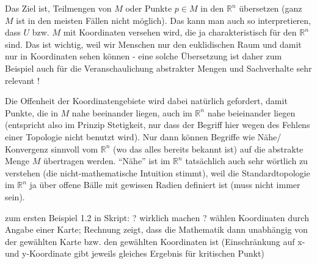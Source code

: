 \documentclass[../H_Analysis_main.tex]{subfiles}
\begin{document}
Das Ziel ist, Teilmengen von $M$ oder Punkte $p \in M$ in den $\mathbb{R}^n$ übersetzen (ganz $M$ ist in den meisten Fällen nicht möglich). Das kann man auch so interpretieren, dass $U$ bzw. $M$ mit Koordinaten versehen wird, die ja charakteristisch für den $\mathbb{R}^n$ sind. Das ist wichtig, weil wir Menschen nur den euklidischen Raum und damit nur in Koordinaten sehen können - eine solche Übersetzung ist daher zum Beispiel auch für die Veranschaulichung abstrakter Mengen und Sachverhalte sehr relevant !


Die Offenheit der Koordinatengebiete wird dabei natürlich gefordert, damit Punkte, die in $M$ nahe beeinander liegen, auch im $\mathbb{R}^n$ nahe beieinander liegen (entspricht also im Prinzip Stetigkeit, nur dass der Begriff hier wegen des Fehlens einer Topologie nicht benutzt wird). Nur dann können Begriffe wie Nähe/ Konvergenz sinnvoll vom $\mathbb{R}^n$ (wo das alles bereits bekannt ist) auf die abstrakte Menge $M$ übertragen werden. \enquote{Nähe} ist im $\mathbb{R}^n$ tatsächlich auch sehr wörtlich zu verstehen (die nicht-mathematische Intuition stimmt), weil die Standardtopologie im $\mathbb{R}^n$ ja über offene Bälle mit gewissen Radien definiert ist (muss nicht immer sein).


\begin{bsp}
zum ersten Beispiel 1.2 in Skript: ? wirklich machen ?
wählen Koordinaten durch Angabe einer Karte; Rechnung zeigt, dass die Mathematik dann unabhängig von der gewählten Karte bzw. den gewählten Koordinaten ist (Einschränkung auf x- und y-Koordinate gibt jeweils gleiches Ergebnis für kritischen Punkt)
\end{bsp}
\end{document}
